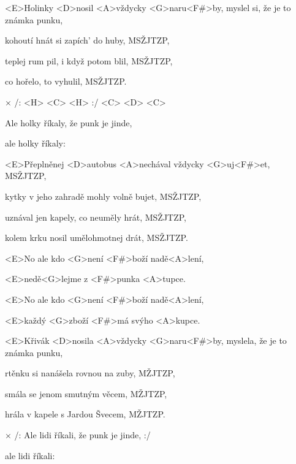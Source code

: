 

\zs
<E>Holinky <D>nosil <A>vždycky <G>naru<F#>by, myslel si, že je to známka punku,

kohoutí hnát si zapích' do huby, MSŽJTZP,

teplej rum pil, i když potom blil, MSŽJTZP,

co hořelo, to vyhulil, MSŽJTZP.
\ks

× /: <H> <C> <H> :/ <C> <D> <C>

Ale holky říkaly,
že punk je jinde,

ale holky říkaly:
\kr

\zs
<E>Přeplněnej <D>autobus <A>nechával vždycky <G>uj<F#>et, MSŽJTZP,

kytky v jeho zahradě mohly volně bujet, MSŽJTZP,

uznával jen kapely, co neuměly hrát, MSŽJTZP,

kolem krku nosil umělohmotnej drát, MSŽJTZP.
\ks

\zr \kr

\zs
<E>No ale kdo <G>není <F#>boží nadě<A>lení,

<E>nedě<G>lejme z <F#>punka <A>tupce.

<E>No ale kdo <G>není <F#>boží nadě<A>lení,

<E>každý <G>zboží <F#>má svýho <A>kupce.
\ks

\zs
<E>Křivák <D>nosila <A>vždycky <G>naru<F#>by,
myslela, že je to známka punku,

rtěnku si nanášela rovnou na zuby, MŽJTZP,

smála se jenom smutným věcem, MŽJTZP,

hrála v kapele s Jardou Švecem, MŽJTZP.
\ks

× /: Ale lidi říkali,
že punk je jinde, :/

ale lidi říkali:
\kr

\kp
